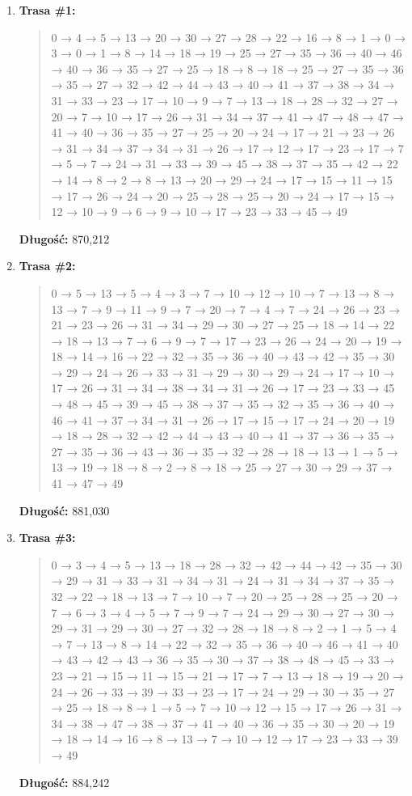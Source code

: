 \documentclass{article}
\begin{document}
\begin{enumerate}
    \item \textbf{Trasa \#1:}
    \begin{quote}
        0 → 4 → 5 → 13 → 20 → 30 → 27 → 28 → 22 → 16 → 8 → 1 → 0 → 3 → 0 → 1 → 8 → 14 → 18 → 19 → 25 → 27 → 35 → 36 → 40 → 46 → 40 → 36 → 35 → 27 → 25 → 18 → 8 → 18 → 25 → 27 → 35 → 36 → 35 → 27 → 32 → 42 → 44 → 43 → 40 → 41 → 37 → 38 → 34 → 31 → 33 → 23 → 17 → 10 → 9 → 7 → 13 → 18 → 28 → 32 → 27 → 20 → 7 → 10 → 17 → 26 → 31 → 34 → 37 → 41 → 47 → 48 → 47 → 41 → 40 → 36 → 35 → 27 → 25 → 20 → 24 → 17 → 21 → 23 → 26 → 31 → 34 → 37 → 34 → 31 → 26 → 17 → 12 → 17 → 23 → 17 → 7 → 5 → 7 → 24 → 31 → 33 → 39 → 45 → 38 → 37 → 35 → 42 → 22 → 14 → 8 → 2 → 8 → 13 → 20 → 29 → 24 → 17 → 15 → 11 → 15 → 17 → 26 → 24 → 20 → 25 → 28 → 25 → 20 → 24 → 17 → 15 → 12 → 10 → 9 → 6 → 9 → 10 → 17 → 23 → 33 → 45 → 49
    \end{quote}
    \textbf{Długość:} 870{,}212

    \item \textbf{Trasa \#2:}
    \begin{quote}
        0 → 5 → 13 → 5 → 4 → 3 → 7 → 10 → 12 → 10 → 7 → 13 → 8 → 13 → 7 → 9 → 11 → 9 → 7 → 20 → 7 → 4 → 7 → 24 → 26 → 23 → 21 → 23 → 26 → 31 → 34 → 29 → 30 → 27 → 25 → 18 → 14 → 22 → 18 → 13 → 7 → 6 → 9 → 7 → 17 → 23 → 26 → 24 → 20 → 19 → 18 → 14 → 16 → 22 → 32 → 35 → 36 → 40 → 43 → 42 → 35 → 30 → 29 → 24 → 26 → 33 → 31 → 29 → 30 → 29 → 24 → 17 → 10 → 17 → 26 → 31 → 34 → 38 → 34 → 31 → 26 → 17 → 23 → 33 → 45 → 48 → 45 → 39 → 45 → 38 → 37 → 35 → 32 → 35 → 36 → 40 → 46 → 41 → 37 → 34 → 31 → 26 → 17 → 15 → 17 → 24 → 20 → 19 → 18 → 28 → 32 → 42 → 44 → 43 → 40 → 41 → 37 → 36 → 35 → 27 → 35 → 36 → 43 → 36 → 35 → 32 → 28 → 18 → 13 → 1 → 5 → 13 → 19 → 18 → 8 → 2 → 8 → 18 → 25 → 27 → 30 → 29 → 37 → 41 → 47 → 49
    \end{quote}
    \textbf{Długość:} 881{,}030

    \item \textbf{Trasa \#3:}
    \begin{quote}
        0 → 3 → 4 → 5 → 13 → 18 → 28 → 32 → 42 → 44 → 42 → 35 → 30 → 29 → 31 → 33 → 31 → 34 → 31 → 24 → 31 → 34 → 37 → 35 → 32 → 22 → 18 → 13 → 7 → 10 → 7 → 20 → 25 → 28 → 25 → 20 → 7 → 6 → 3 → 4 → 5 → 7 → 9 → 7 → 24 → 29 → 30 → 27 → 30 → 29 → 31 → 29 → 30 → 27 → 32 → 28 → 18 → 8 → 2 → 1 → 5 → 4 → 7 → 13 → 8 → 14 → 22 → 32 → 35 → 36 → 40 → 46 → 41 → 40 → 43 → 42 → 43 → 36 → 35 → 30 → 37 → 38 → 48 → 45 → 33 → 23 → 21 → 15 → 11 → 15 → 21 → 17 → 7 → 13 → 18 → 19 → 20 → 24 → 26 → 33 → 39 → 33 → 23 → 17 → 24 → 29 → 30 → 35 → 27 → 25 → 18 → 8 → 1 → 5 → 7 → 10 → 12 → 15 → 17 → 26 → 31 → 34 → 38 → 47 → 38 → 37 → 41 → 40 → 36 → 35 → 30 → 20 → 19 → 18 → 14 → 16 → 8 → 13 → 7 → 10 → 12 → 17 → 23 → 33 → 39 → 49
    \end{quote}
    \textbf{Długość:} 884{,}242


\end{enumerate}
\end{document}
